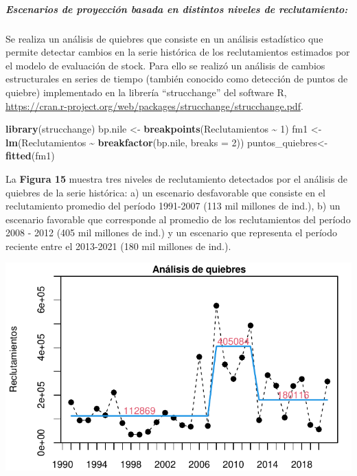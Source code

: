 \documentclass[
  spanish,
]{article}
\newenvironment{Shaded}{\begin{snugshade}}{\end{snugshade}}
\newcommand{\DataTypeTok}[1]{\textcolor[rgb]{0.13,0.29,0.53}{#1}}
\newcommand{\DecValTok}[1]{\textcolor[rgb]{0.00,0.00,0.81}{#1}}
\newcommand{\KeywordTok}[1]{\textcolor[rgb]{0.13,0.29,0.53}{\textbf{#1}}}
\newcommand{\NormalTok}[1]{#1}
\newcommand{\OperatorTok}[1]{\textcolor[rgb]{0.81,0.36,0.00}{\textbf{#1}}}
\newcommand{\StringTok}[1]{\textcolor[rgb]{0.31,0.60,0.02}{#1}}
\begin{document}
\hypertarget{escenarios-de-proyecciuxf3n-basada-en-distintos-niveles-de-reclutamiento}{%
\subparagraph{Escenarios de proyección basada en distintos niveles de
reclutamiento:}\label{escenarios-de-proyecciuxf3n-basada-en-distintos-niveles-de-reclutamiento}}

Se realiza un análisis de quiebres que consiste en un análisis
estadístico que permite detectar cambios en la serie histórica de los
reclutamientos estimados por el modelo de evaluación de stock. Para ello
se realizó un análisis de cambios estructurales en series de tiempo
(también conocido como detección de puntos de quiebre) implementado en
la librería ``strucchange'' del software R,
\url{https://cran.r-project.org/web/packages/strucchange/strucchange.pdf}.

\begin{Shaded}
\begin{Highlighting}[]
\KeywordTok{library}\NormalTok{(strucchange)}
\NormalTok{bp.nile \textless{}{-}}\StringTok{ }\KeywordTok{breakpoints}\NormalTok{(Reclutamientos }\OperatorTok{\textasciitilde{}}\StringTok{ }\DecValTok{1}\NormalTok{)}
\NormalTok{fm1 \textless{}{-}}\StringTok{ }\KeywordTok{lm}\NormalTok{(Reclutamientos }\OperatorTok{\textasciitilde{}}\StringTok{ }\KeywordTok{breakfactor}\NormalTok{(bp.nile, }\DataTypeTok{breaks =} \DecValTok{2}\NormalTok{))}
\NormalTok{puntos\_quiebres\textless{}{-}}\KeywordTok{fitted}\NormalTok{(fm1)}
\end{Highlighting}
\end{Shaded}

La \textbf{Figura 15} muestra tres niveles de reclutamiento detectados
por el análisis de quiebres de la serie histórica: a) un escenario
desfavorable que consiste en el reclutamiento promedio del período
1991-2007 (113 mil millones de ind.), b) un escenario favorable que
corresponde al promedio de los reclutamientos del período 2008 - 2012
(405 mil millones de ind.) y un escenario que representa el período
reciente entre el 2013-2021 (180 mil millones de ind.).

\begin{center}\includegraphics{FigurasInforme_Marzo/antecedentes_Reclproy_sept-1} \end{center}
\end{document}
